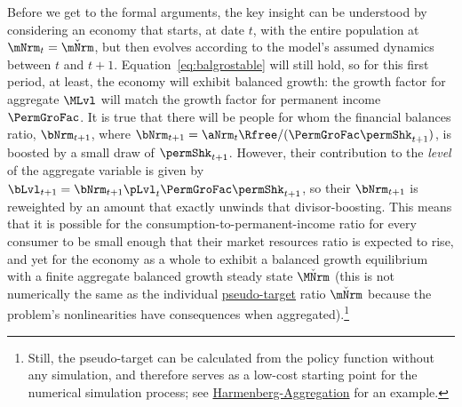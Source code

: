 \documentclass[BufferStockTheory]{subfiles}
\begin{document}
Before we get to the formal arguments, the key insight can be understood by considering an economy that starts, at date $t$, with the entire population at $\mNrm_{t}=\mBalLvl$, but then evolves according to the model's assumed dynamics between $t$ and $t+1$.
Equation~\eqref{eq:balgrostable} will still hold, so for this first period, at least, the economy will exhibit balanced growth: the growth factor for aggregate $\MLvl$ will match the growth factor for permanent income $\PermGroFac$.
It is true that there will be people for whom the financial balances ratio, $\bNrm_{t+1}$, where $\bNrm_{t+1} = \aNrm_{t}\Rfree/(\PermGroFac\permShk_{t+1})$, is boosted by a small draw of $\permShk_{t+1}$.
However, their contribution to the \textit{level} of the aggregate variable is given by $\bLvl_{t+1}=\bNrm_{t+1}\pLvl_{t}\PermGroFac\permShk_{t+1}$, so their $\bNrm_{t+1}$ is reweighted by an amount that exactly unwinds that divisor-boosting.
This means that it is possible for the consumption-to-permanent-income ratio for every consumer to be small enough that their market resources ratio is expected to rise, and yet for the economy as a whole to exhibit a balanced growth equilibrium with a finite aggregate balanced growth steady state $\BalGroFac{\MNrm}$ (this is not numerically the same as the individual \hyperlink{pseudo-steady-state}{pseudo-target} ratio $\mBalLvl$ because the problem's nonlinearities have consequences when aggregated).\footnote{Still, the pseudo-target can be calculated from the policy function without any simulation, and therefore serves as a low-cost starting point for the numerical simulation process; see \href{https://econ-ark.org/materials/harmenberg-aggregation?launch}{Harmenberg-Aggregation} for an example.}
\end{document}
